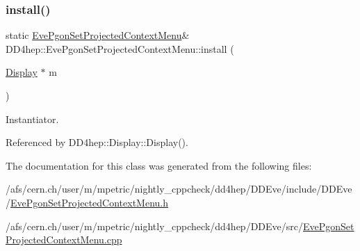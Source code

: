 \subsubsection{\texorpdfstring{install()}{install()}}
{\footnotesize\ttfamily static \hyperlink{class_d_d4hep_1_1_eve_pgon_set_projected_context_menu}{Eve\+Pgon\+Set\+Projected\+Context\+Menu}\& D\+D4hep\+::\+Eve\+Pgon\+Set\+Projected\+Context\+Menu\+::install (\begin{DoxyParamCaption}\item[{\hyperlink{class_d_d4hep_1_1_display}{Display} $\ast$}]{m }\end{DoxyParamCaption})\hspace{0.3cm}{\ttfamily [static]}}



Instantiator. 



Referenced by D\+D4hep\+::\+Display\+::\+Display().



The documentation for this class was generated from the following files\+:\begin{DoxyCompactItemize}
\item 
/afs/cern.\+ch/user/m/mpetric/nightly\+\_\+cppcheck/dd4hep/\+D\+D\+Eve/include/\+D\+D\+Eve/\hyperlink{_eve_pgon_set_projected_context_menu_8h}{Eve\+Pgon\+Set\+Projected\+Context\+Menu.\+h}\item 
/afs/cern.\+ch/user/m/mpetric/nightly\+\_\+cppcheck/dd4hep/\+D\+D\+Eve/src/\hyperlink{_eve_pgon_set_projected_context_menu_8cpp}{Eve\+Pgon\+Set\+Projected\+Context\+Menu.\+cpp}\end{DoxyCompactItemize}
